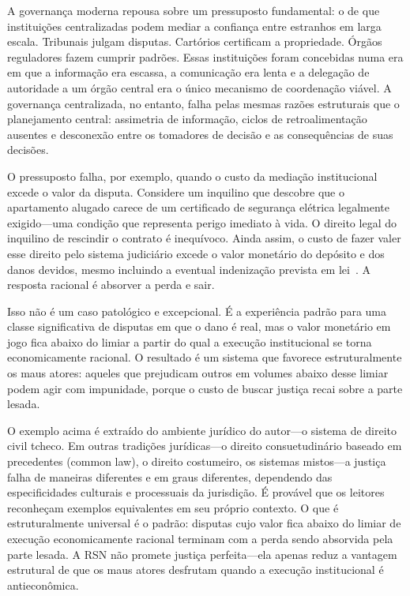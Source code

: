 \documentclass[11pt,a4paper,twocolumn]{article}
\begin{document}
A governança moderna repousa sobre um pressuposto fundamental: o de que instituições centralizadas podem mediar a confiança entre estranhos em larga escala. Tribunais julgam disputas. Cartórios certificam a propriedade. Órgãos reguladores fazem cumprir padrões. Essas instituições foram concebidas numa era em que a informação era escassa, a comunicação era lenta e a delegação de autoridade a um órgão central era o único mecanismo de coordenação viável. A governança centralizada, no entanto, falha pelas mesmas razões estruturais que o planejamento central: assimetria de informação, ciclos de retroalimentação ausentes e desconexão entre os tomadores de decisão e as consequências de suas decisões.

O pressuposto falha, por exemplo, quando o custo da mediação institucional excede o valor da disputa. Considere um inquilino que descobre que o apartamento alugado carece de um certificado de segurança elétrica legalmente exigido---uma condição que representa perigo imediato à vida. O direito legal do inquilino de rescindir o contrato é inequívoco. Ainda assim, o custo de fazer valer esse direito pelo sistema judiciário excede o valor monetário do depósito e dos danos devidos, mesmo incluindo a eventual indenização prevista em lei~\cite{czcourtfees}. A resposta racional é absorver a perda e sair.

Isso não é um caso patológico e excepcional. É a experiência padrão para uma classe significativa de disputas em que o dano é real, mas o valor monetário em jogo fica abaixo do limiar a partir do qual a execução institucional se torna economicamente racional. O resultado é um sistema que favorece estruturalmente os maus atores: aqueles que prejudicam outros em volumes abaixo desse limiar podem agir com impunidade, porque o custo de buscar justiça recai sobre a parte lesada.

O exemplo acima é extraído do ambiente jurídico do autor---o sistema de direito civil tcheco. Em outras tradições jurídicas---o direito consuetudinário baseado em precedentes (common law), o direito costumeiro, os sistemas mistos---a justiça falha de maneiras diferentes e em graus diferentes, dependendo das especificidades culturais e processuais da jurisdição. É provável que os leitores reconheçam exemplos equivalentes em seu próprio contexto. O que é estruturalmente universal é o padrão: disputas cujo valor fica abaixo do limiar de execução economicamente racional terminam com a perda sendo absorvida pela parte lesada. A RSN não promete justiça perfeita---ela apenas reduz a vantagem estrutural de que os maus atores desfrutam quando a execução institucional é antieconômica.
\end{document}
